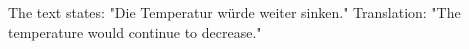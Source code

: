 The text states:  
"Die Temperatur würde weiter sinken."  
Translation: "The temperature would continue to decrease."